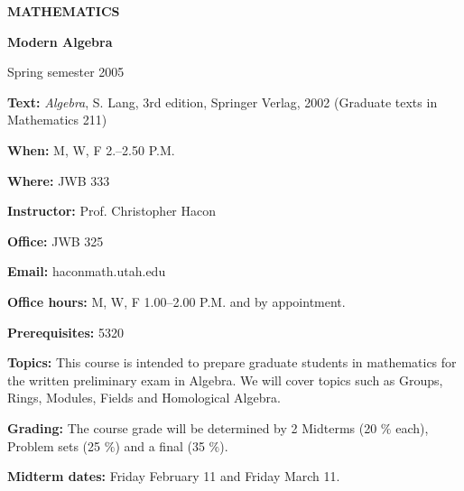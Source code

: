 \UseAMSsymbols
\bigskip\bigskip\bigskip\bigskip
\centerline{\bf MATHEMATICS }
\centerline{\bf Modern Algebra}
\centerline{Spring semester 2005}
\bigskip

\noindent
{\bf Text:} {\it Algebra}, S. Lang, 3rd edition, Springer Verlag, 2002
(Graduate texts in Mathematics 211)
  
\medskip
\noindent
{\bf When:} {M, W, F 2.--2.50 P.M.}

\medskip
\noindent
{\bf Where:} {JWB 333}

\medskip
\noindent
{\bf Instructor:} {Prof. Christopher Hacon}
 
\medskip
\noindent
{\bf Office:} {JWB 325}

\medskip
\noindent
{\bf Email:} {hacon{\@}math.utah.edu}

\medskip
\noindent
{\bf Office hours:} M, W, F 1.00--2.00 P.M. and by appointment.

\medskip
\noindent
{\bf Prerequisites:} 5320

\medskip
\noindent
{\bf Topics:} This course is intended to prepare graduate students in 
mathematics for the written preliminary exam in Algebra. We will
cover topics such as Groups, Rings, Modules, Fields and Homological Algebra.

\medskip
\noindent
{\bf Grading:} The course grade will be determined by 2 Midterms (20 
$\%$ each), Problem sets (25 $\%$) and a final (35 $\%$).

\medskip
\noindent
{\bf Midterm dates:} Friday February 11 and Friday March 11.

